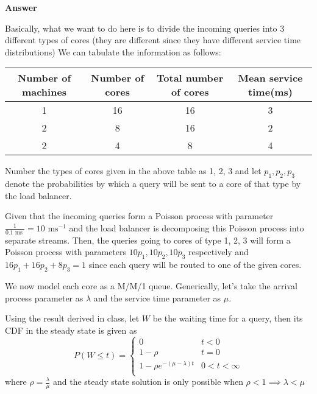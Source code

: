 \documentclass[12pt, oneside]{article}
\begin{document}
\begin{enumerate}
{    \textbf{Answer}

    Basically, what we want to do here is to divide the incoming queries into 3 different
    types of cores (they are different since they have different service time distributions)
    We can tabulate the information as follows:

    \begin{center}
        \begin{tabular}{| c | c | c | c |}
            \hline
            Number of machines & Number of cores & Total number of cores & Mean service time(ms) \\
            \hline
            1 & 16 & 16 & 3 \\
            2 & 8 & 16 & 2 \\
            2 & 4 & 8 & 4 \\
            \hline
        \end{tabular}
    \end{center}

    Number the types of cores given in the above table as 1, 2, 3 and let \(p_1, p_2, p_3\)
    denote the probabilities by which a query will be sent to a core of that type by the load
    balancer.

    Given that the incoming queries form a Poisson process with parameter 
    \(\frac{1}{0.1 \text{ ms }} = 10 \text{ ms}^{-1}\) and the load balancer is decomposing
    this Poisson process into separate streams. Then, the queries going to cores of type
    1, 2, 3 will form a Poisson process with parameters \(10p_1, 10p_2, 10p_3\) respectively
    and \(16p_1 + 16p_2 + 8p_3 = 1\) since each query will be routed to one of the given
    cores.

    We now model each core as a M/M/1 queue. Generically, let's take the arrival process
    parameter as \(\lambda\) and the service time parameter as \(\mu\).

    Using the result derived in class, let \(W\) be the waiting time for a query, then
    its CDF in the steady state is given as
    \[
        P(W \leq t) = \begin{cases}
                        0 & t < 0 \\
                        1 - \rho & t = 0 \\
                        1 - \rho e^{-(\mu - \lambda)t} & 0 < t < \infty \\
                      \end{cases}
    \]
    where \(\rho = \frac{\lambda}{\mu}\) and the steady state solution is only possible
    when \(\rho < 1 \implies \lambda < \mu\)

}
\end{enumerate}
\end{document}
